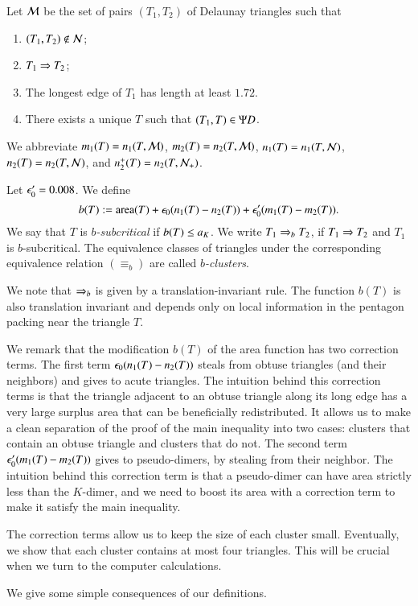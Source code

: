 Let $\mathcal M$ be the set of pairs $(T_1,T_2)$ of Delaunay triangles such that
\begin{enumerate}
\item $(T_1,T_2)\not\in \mathcal N$;
\item $T_1\Rightarrow T_2$;
\item The longest edge of $T_1$ has length  at least $1.72$.
\item There exists a unique $T$ such that $(T_1,T)\in \Psi D$.
\end{enumerate}

We abbreviate $m_1(T) = n_1(T,\mathcal M)$, $m_2(T) = n_2(T,\mathcal M)$, $n_1(T) = n_1(T,\mathcal N)$, $n_2(T) = n_2(T,\mathcal N)$,
and $n_2^+(T) = n_2(T,\mathcal N_+)$.

Let $\epsilon_0' = 0.008$.  We define
\[
b(T) := {\operatorname{area}}(T) + \epsilon_0 (n_1(T) - n_2(T)) + \epsilon_0' (m_1(T) - m_2(T)).
\]
We say that $T$ is {\it $b$-subcritical} if $b(T) \le a_K$.  We write
$T_1\Rightarrow_{b} T_2$, if $T_1\Rightarrow T_2$ and $T_1$ is $b$-subcritical.
The equivalence classes of triangles under the corresponding
equivalence relation $(\equiv_b)$ are called {\it $b$-clusters}.

We note that $\Rightarrow_{b}$ is given by a translation-invariant rule.  The function $b(T)$ is also
translation invariant and depends only on local information in the pentagon packing near  the triangle $T$.

We remark that the modification $b(T)$ of the area function has two correction terms.
The first term $\epsilon_0 (n_1(T) - n_2(T))$ steals from obtuse triangles (and their neighbors) and gives 
 to acute triangles.  
The intuition behind this correction terms is that the triangle adjacent to an obtuse triangle along its long edge
has a very large surplus area that can be beneficially redistributed.  It allows us to make a clean separation of
the proof of the main inequality into two cases: clusters that contain an obtuse triangle and clusters that do not.
The second term $\epsilon_0' (m_1(T) - m_2(T))$ gives to pseudo-dimers, by stealing from
their neighbor.   The intuition behind this correction term is that a pseudo-dimer can have area strictly less than
the $K$-dimer, and we need to boost its area with a correction term to make it satisfy the main
inequality.  

The correction terms allow us to keep the size of each cluster small.  Eventually, we show that each
cluster contains at most four triangles.  This will be crucial when we turn to the computer calculations.

We give  some simple consequences of our definitions.

